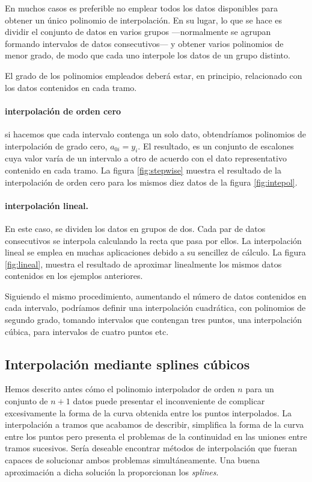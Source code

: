 \begin{paracol}{2}
En muchos casos es preferible no emplear todos los datos disponibles para obtener un único polinomio de interpolación. En su lugar, lo que se hace es dividir el conjunto de datos en varios grupos ---normalmente se agrupan formando intervalos de datos consecutivos--- y obtener varios polinomios de menor grado, de modo que cada uno interpole los datos de un grupo distinto. 

El grado de los polinomios empleados deberá estar, en principio, relacionado con los datos contenidos en cada tramo.


\paragraph{interpolación de orden cero}  si hacemos que cada intervalo contenga un solo dato, obtendríamos polinomios de interpolación de grado cero, $a_{0i}=y_i$. El resultado, es un conjunto de escalones cuya valor varía de un intervalo a otro de acuerdo con el dato representativo contenido en cada tramo. La figura \ref{fig:stepwise} muestra el resultado de la interpolación de orden cero para los mismos diez datos de la figura \ref{fig:intepol}.

\paragraph{interpolación lineal.}  En este caso, se dividen los datos en grupos de dos. Cada par de datos consecutivos se interpola calculando la recta que pasa por ellos. La interpolación lineal se emplea en muchas aplicaciones debido a su sencillez de cálculo. La figura \ref{fig:lineal}, muestra el resultado de aproximar linealmente los mismos datos contenidos en los ejemplos anteriores.

Siguiendo el mismo procedimiento, aumentando el número de datos contenidos en cada intervalo, podríamos definir una interpolación cuadrática, con polinomios de segundo grado, tomando intervalos que contengan tres puntos, una interpolación cúbica, para intervalos de cuatro puntos etc.

\subsection{Interpolación mediante splines cúbicos} 
Hemos descrito antes cómo el polinomio interpolador de orden $n$ para un conjunto de $n+1$ datos puede presentar el inconveniente de complicar excesivamente la forma de  la curva obtenida entre los puntos interpolados. La interpolación a tramos que acabamos de describir, simplifica la forma de la curva entre los puntos pero presenta el problemas de la continuidad en las uniones entre tramos sucesivos. Sería deseable encontrar métodos de interpolación que fueran capaces de solucionar ambos problemas simultáneamente. Una buena aproximación a dicha solución la proporcionan los \emph{splines}.


\end{paracol}
